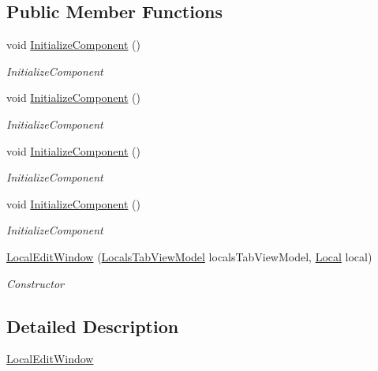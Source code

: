 \subsection*{Public Member Functions}
\begin{DoxyCompactItemize}
\item 
void \hyperlink{class_baudi_1_1_client_1_1_view_1_1_edit_windows_1_1_local_edit_window_af56e5ea83e7593969d47763271be483e}{Initialize\+Component} ()
\begin{DoxyCompactList}\small\item\em Initialize\+Component \end{DoxyCompactList}\item 
void \hyperlink{class_baudi_1_1_client_1_1_view_1_1_edit_windows_1_1_local_edit_window_af56e5ea83e7593969d47763271be483e}{Initialize\+Component} ()
\begin{DoxyCompactList}\small\item\em Initialize\+Component \end{DoxyCompactList}\item 
void \hyperlink{class_baudi_1_1_client_1_1_view_1_1_edit_windows_1_1_local_edit_window_af56e5ea83e7593969d47763271be483e}{Initialize\+Component} ()
\begin{DoxyCompactList}\small\item\em Initialize\+Component \end{DoxyCompactList}\item 
void \hyperlink{class_baudi_1_1_client_1_1_view_1_1_edit_windows_1_1_local_edit_window_af56e5ea83e7593969d47763271be483e}{Initialize\+Component} ()
\begin{DoxyCompactList}\small\item\em Initialize\+Component \end{DoxyCompactList}\item 
\hyperlink{class_baudi_1_1_client_1_1_view_1_1_edit_windows_1_1_local_edit_window_ae5e095aab77d499cd44e0886ceefebc2}{Local\+Edit\+Window} (\hyperlink{class_baudi_1_1_client_1_1_view_models_1_1_tabs_view_models_1_1_locals_tab_view_model}{Locals\+Tab\+View\+Model} locals\+Tab\+View\+Model, \hyperlink{class_baudi_1_1_d_a_l_1_1_models_1_1_local}{Local} local)
\begin{DoxyCompactList}\small\item\em Constructor \end{DoxyCompactList}\end{DoxyCompactItemize}


\subsection{Detailed Description}
\hyperlink{class_baudi_1_1_client_1_1_view_1_1_edit_windows_1_1_local_edit_window}{Local\+Edit\+Window} 



